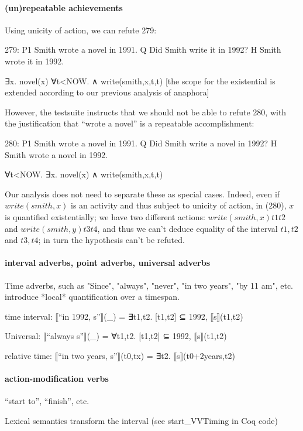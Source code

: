 \documentclass[a4paper,11pt]{article}
\begin{document}
\paragraph{(un)repeatable achievements}
Using unicity of action, we can refute 279:

279:
P1	Smith wrote a novel in 1991.
Q 	Did Smith write it in 1992?
H 	Smith wrote it in 1992.

∃x. novel(x)
∀t<NOW.  ∧ write(smith,x,t,t) [the scope for the existential is extended according to our previous analysis of anaphora]

However, the testsuite instructs that we should not be able to refute
280, with the justification that ``wrote a novel'' is a repeatable
accomplishment:

280:
P1	Smith wrote a novel in 1991.
Q 	Did Smith write a novel in 1992?
H 	Smith wrote a novel in 1992.

∀t<NOW. ∃x. novel(x) ∧ write(smith,x,t,t)

Our analysis does not need to separate these as special cases. Indeed,
even if $write(smith,x)$ is an activity and thus subject to unicity of
action, in (280), $x$ is quantified existentially; we have two
different actions: $write(smith,x) t1 t2$ and $write(smith,y) t3 t4$,
and thus we can't deduce equality of the interval $t1,t2$ and $t3,t4$;
in turn the hypothesis can't be refuted.

\paragraph{interval adverbs, point adverbs, universal adverbs}
Time adverbs, such as "Since", "always", "never", "in two years", "by
11 am", etc. introduce *local* quantification over a timespan.

time interval:
⟦``in 1992, s''⟧(_) = ∃t1,t2.  [t1,t2] ⊆ 1992, ⟦s⟧(t1,t2)

Universal:
⟦``always s''⟧(_) = ∀t1,t2.  [t1,t2] ⊆ 1992, ⟦s⟧(t1,t2)

relative time:
⟦``in two years, s''⟧(t0,tx) = ∃t2.  ⟦s⟧(t0+2years,t2)

\paragraph{action-modification verbs}

``start to'', ``finish'', etc.

Lexical semantics transform the interval (see start_VVTiming in Coq code)
\end{document}
